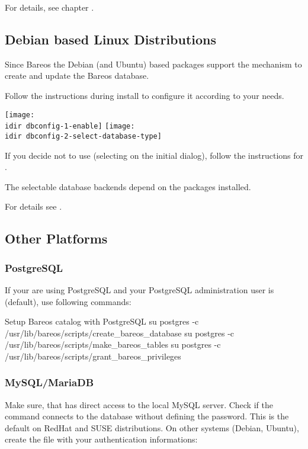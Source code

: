 For details, see chapter .

\subsection{Debian based Linux Distributions}

Since Bareos  the Debian (and Ubuntu) based packages support the  mechanism to create and update the Bareos database.

Follow the instructions during install to configure it according to your needs.

\begin{center}
\texttt{[image: \\idir dbconfig-1-enable]}
\texttt{[image: \\idir dbconfig-2-select-database-type]}
\end{center}

If you decide not to use  (selecting  on the initial dialog), 
follow the instructions for .

The selectable database backends depend on the  packages installed.

For details see .

\subsection{Other Platforms}
    \label{sec:CreateDatabaseOtherDistributions}

\subsubsection{PostgreSQL}
If your are using PostgreSQL and your PostgreSQL administration user is  (default), use following commands:

\begin{commands}{Setup Bareos catalog with PostgreSQL}
su postgres -c /usr/lib/bareos/scripts/create_bareos_database
su postgres -c /usr/lib/bareos/scripts/make_bareos_tables
su postgres -c /usr/lib/bareos/scripts/grant_bareos_privileges
\end{commands}


\subsubsection{MySQL/MariaDB}
Make sure, that  has direct access to the local MySQL server. 
Check if the command  connects to the database without defining the password.
This is the default on RedHat and SUSE distributions. 
On other systems (Debian, Ubuntu),
create the file  with your authentication informations:

